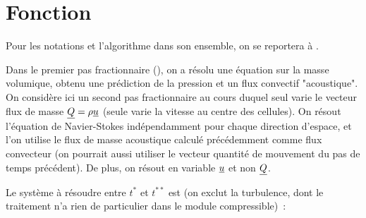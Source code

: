 %
% 
%
% 
% 
% 
%
%
%
\vspace{1cm}
\section{Fonction}

Pour les notations et l'algorithme dans son ensemble, 
on se reportera \`a . 

Dans le premier pas fractionnaire (), on a r\'esolu une 
\'equation sur la masse volumique, obtenu une pr\'ediction de la pression
et un flux convectif "acoustique".
On consid\`ere ici un second pas fractionnaire au cours duquel seul varie
le vecteur flux de masse $\underline{Q}=\rho\underline{u}$
(seule varie la vitesse au centre des cellules).
On r\'esout l'\'equation de Navier-Stokes ind\'ependamment
pour chaque direction d'espace, et l'on utilise le flux de masse acoustique
calcul\'e pr\'ec\'edemment comme flux convecteur (on pourrait aussi utiliser
le vecteur quantit\'e de mouvement du pas de temps pr\'ec\'edent).
De plus, on r\'esout en variable $\underline{u}$ et non $\underline{Q}$.

Le syst\`eme \`a r\'esoudre entre $t^*$ et $t^{**}$ est (on exclut 
la turbulence, dont le traitement n'a rien de particulier dans le 
module compressible)~:

